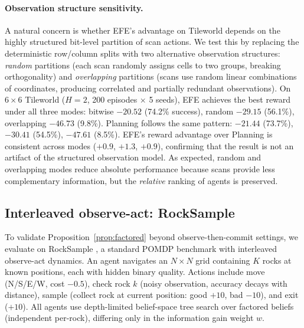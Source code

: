 \documentclass{article}
\begin{document}
\paragraph{Observation structure sensitivity.} A natural concern is whether EFE's advantage on Tileworld depends on the highly structured bit-level partition of scan actions. We test this by replacing the deterministic row/column splits with two alternative observation structures: \emph{random} partitions (each scan randomly assigns cells to two groups, breaking orthogonality) and \emph{overlapping} partitions (scans use random linear combinations of coordinates, producing correlated and partially redundant observations). On $6{\times}6$ Tileworld ($H{=}2$, 200 episodes $\times$ 5 seeds), EFE achieves the best reward under all three modes: bitwise $-20.52$ (74.2\% success), random $-29.15$ (56.1\%), overlapping $-46.73$ (9.8\%). Planning follows the same pattern: $-21.44$ (73.7\%), $-30.41$ (54.5\%), $-47.61$ (8.5\%). EFE's reward advantage over Planning is consistent across modes ($+0.9$, $+1.3$, $+0.9$), confirming that the result is not an artifact of the structured observation model. As expected, random and overlapping modes reduce absolute performance because scans provide less complementary information, but the \emph{relative} ranking of agents is preserved.

\subsection{Interleaved observe-act: RockSample}
\label{sec:rocksample}

To validate Proposition~\ref{prop:factored} beyond observe-then-commit settings, we evaluate on RockSample \citep{smith2004}, a standard POMDP benchmark with interleaved observe-act dynamics. An agent navigates an $N{\times}N$ grid containing $K$ rocks at known positions, each with hidden binary quality. Actions include move (N/S/E/W, cost $-0.5$), check rock $k$ (noisy observation, accuracy decays with distance), sample (collect rock at current position: good $+10$, bad $-10$), and exit ($+10$). All agents use depth-limited belief-space tree search over factored beliefs (independent per-rock), differing only in the information gain weight $w$.
\end{document}

